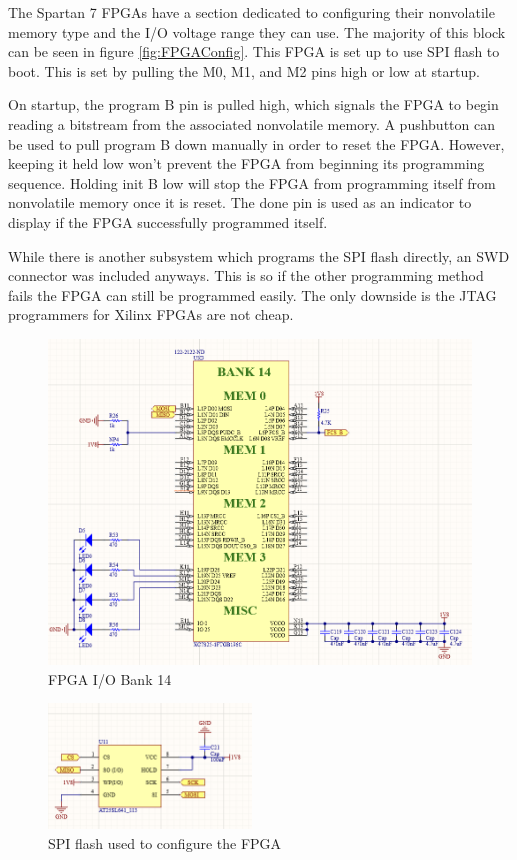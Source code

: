 \documentclass[crop=false]{standalone}
\begin{document}
        The Spartan 7 FPGAs have a section dedicated to configuring their nonvolatile memory type and the I/O voltage range they can use. The majority of this block can be seen in figure \ref{fig:FPGAConfig}. This FPGA is set up to use SPI flash to boot. This is set by pulling the M0, M1, and M2 pins high or low at startup.
            
        On startup, the program B pin is pulled high, which signals the FPGA to begin reading a bitstream from the associated nonvolatile memory. A pushbutton can be used to pull program B down manually in order to reset the FPGA. However, keeping it held low won't prevent the FPGA from beginning its programming sequence. Holding init B low will stop the FPGA from programming itself from nonvolatile memory once it is reset. The done pin is used as an indicator to display if the FPGA successfully programmed itself.
            
        While there is another subsystem which programs the SPI flash directly, an SWD connector was included anyways. This is so if the other programming method fails the FPGA can still be programmed easily. The only downside is the JTAG programmers for Xilinx FPGAs are not cheap.
            
        \begin{figure}[H]
            \centering
            \includegraphics[width=\textwidth]{FPGABank14.PNG}
            \caption{FPGA I/O Bank 14}
            \label{fig:FPGABank14}
        \end{figure}
            
        \begin{figure}
            \centering
            \includegraphics[width=0.48\textwidth]{FPGASPIFlash.PNG}
            \caption{SPI flash used to configure the FPGA}
            \label{fig:FPGASPIFlash}
        \end{figure}
            
\end{document}
